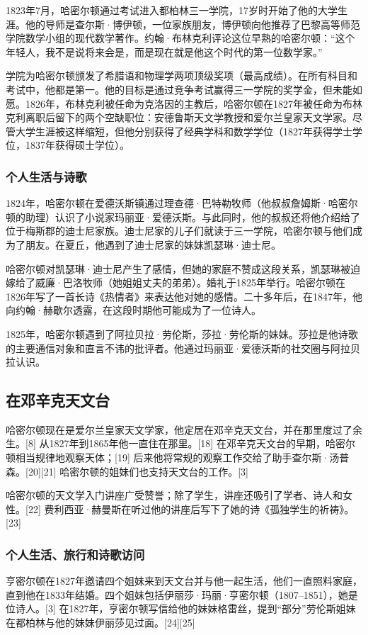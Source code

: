 1823年7月，哈密尔顿通过考试进入都柏林三一学院，17岁时开始了他的大学生涯。他的导师是查尔斯·博伊顿，一位家族朋友，博伊顿向他推荐了巴黎高等师范学院数学小组的现代数学著作。约翰·布林克利评论这位早熟的哈密尔顿：“这个年轻人，我不是说将来会是，而是现在就是他这个时代的第一位数学家。”

学院为哈密尔顿颁发了希腊语和物理学两项顶级奖项（最高成绩）。在所有科目和考试中，他都是第一。他的目标是通过竞争考试赢得三一学院的奖学金，但未能如愿。1826年，布林克利被任命为克洛因的主教后，哈密尔顿在1827年被任命为布林克利离职后留下的两个空缺职位：安德鲁斯天文学教授和爱尔兰皇家天文学家。尽管大学生涯被这样缩短，但他分别获得了经典学科和数学学位（1827年获得学士学位，1837年获得硕士学位）。
\subsubsection{个人生活与诗歌} 
1824年，哈密尔顿在爱德沃斯镇通过理查德·巴特勒牧师（他叔叔詹姆斯·哈密尔顿的助理）认识了小说家玛丽亚·爱德沃斯。与此同时，他的叔叔还将他介绍给了位于梅斯郡的迪士尼家族。迪士尼家的儿子们就读于三一学院，哈密尔顿与他们成为了朋友。在夏丘，他遇到了迪士尼家的妹妹凯瑟琳·迪士尼。

哈密尔顿对凯瑟琳·迪士尼产生了感情，但她的家庭不赞成这段关系，凯瑟琳被迫嫁给了威廉·巴洛牧师（她姐姐丈夫的弟弟）。婚礼于1825年举行。哈密尔顿在1826年写了一首长诗《热情者》来表达他对她的感情。二十多年后，在1847年，他向约翰·赫歇尔透露，在这段时期他可能成为了一位诗人。

1825年，哈密尔顿遇到了阿拉贝拉·劳伦斯，莎拉·劳伦斯的妹妹。莎拉是他诗歌的主要通信对象和直言不讳的批评者。他通过玛丽亚·爱德沃斯的社交圈与阿拉贝拉认识。
\subsection{在邓辛克天文台}
哈密尔顿现在是爱尔兰皇家天文学家，他定居在邓辛克天文台，并在那里度过了余生。[8] 从1827年到1865年他一直住在那里。[18] 在邓辛克天文台的早期，哈密尔顿相当规律地观察天体；[19] 后来他将常规的观察工作交给了助手查尔斯·汤普森。[20][21] 哈密尔顿的姐妹们也支持天文台的工作。[3]

哈密尔顿的天文学入门讲座广受赞誉；除了学生，讲座还吸引了学者、诗人和女性。[22] 费利西亚·赫曼斯在听过他的讲座后写下了她的诗《孤独学生的祈祷》。[23]
\subsubsection{个人生活、旅行和诗歌访问 } 
亨密尔顿在1827年邀请四个姐妹来到天文台并与他一起生活，他们一直照料家庭，直到他在1833年结婚。四个姐妹包括伊丽莎·玛丽·亨密尔顿（1807–1851），她是位诗人。[3] 在1827年，亨密尔顿写信给他的妹妹格雷丝，提到“部分”劳伦斯姐妹在都柏林与他的妹妹伊丽莎见过面。[24][25]

